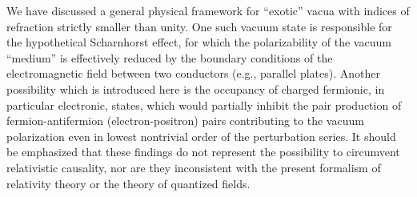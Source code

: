 \documentclass[12pt]{article}
\begin{document}
We have discussed a general  physical framework for ``exotic'' vacua with indices of refraction strictly smaller than unity.
One such vacuum state is responsible for the hypothetical
Scharnhorst effect, for which the polarizability of the vacuum ``medium''
is effectively reduced by the boundary conditions of the electromagnetic field between two conductors (e.g., parallel plates).
Another possibility which is introduced here is the occupancy of charged fermionic, in particular electronic, states,
which would partially inhibit the pair production of fermion-antifermion  (electron-positron) pairs contributing to the
vacuum polarization even in lowest nontrivial order of the perturbation series.
It should be emphasized that these findings do not represent the possibility to circumvent relativistic causality,
nor are they inconsistent with the present formalism of relativity theory or the theory of quantized fields.


\end{document}
